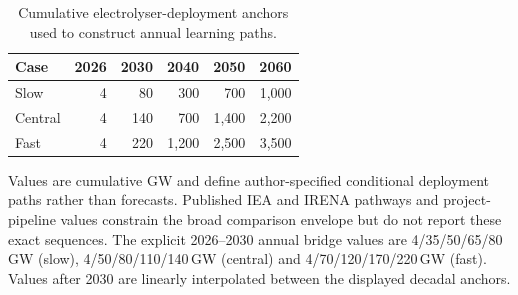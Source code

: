 \documentclass[11pt,a4paper]{article}
\begin{document}
\begin{table}[!ht]
\caption{Cumulative electrolyser-deployment anchors used to construct annual learning paths.}\label{tab:deployment}
\centering
\footnotesize
\begin{tabular}{lrrrrr}
\toprule
Case & 2026 & 2030 & 2040 & 2050 & 2060 \\
\midrule
Slow & 4 & 80 & 300 & 700 & 1,000 \\
Central & 4 & 140 & 700 & 1,400 & 2,200 \\
Fast & 4 & 220 & 1,200 & 2,500 & 3,500 \\
\bottomrule
\end{tabular}
\begin{flushleft}\footnotesize
Values are cumulative GW and define author-specified conditional deployment paths rather than forecasts. Published IEA and IRENA pathways and project-pipeline values constrain the broad comparison envelope but do not report these exact sequences\cite{ieaelectrolysers2024,iea2023nze,iea2021minerals,irena2023}. The explicit 2026--2030 annual bridge values are 4/35/50/65/80\,GW (slow), 4/50/80/110/140\,GW (central) and 4/70/120/170/220\,GW (fast). Values after 2030 are linearly interpolated between the displayed decadal anchors.
\end{flushleft}
\end{table}
\end{document}
